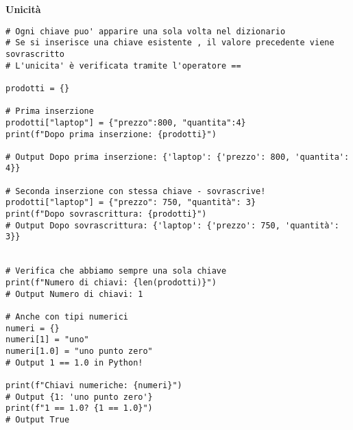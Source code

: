 \vspace{0.5cm}
\textbf{Unicità}
\begin{lstlisting}
# Ogni chiave puo' apparire una sola volta nel dizionario
# Se si inserisce una chiave esistente , il valore precedente viene sovrascritto
# L'unicita' è verificata tramite l'operatore ==

prodotti = {}

# Prima inserzione
prodotti["laptop"] = {"prezzo":800, "quantita":4}
print(f"Dopo prima inserzione: {prodotti}")

# Output Dopo prima inserzione: {'laptop': {'prezzo': 800, 'quantita': 4}}

# Seconda inserzione con stessa chiave - sovrascrive!
prodotti["laptop"] = {"prezzo": 750, "quantità": 3}
print(f"Dopo sovrascrittura: {prodotti}")
# Output Dopo sovrascrittura: {'laptop': {'prezzo': 750, 'quantità': 3}}


# Verifica che abbiamo sempre una sola chiave
print(f"Numero di chiavi: {len(prodotti)}")  
# Output Numero di chiavi: 1

# Anche con tipi numerici
numeri = {}
numeri[1] = "uno"
numeri[1.0] = "uno punto zero"  
# Output 1 == 1.0 in Python!

print(f"Chiavi numeriche: {numeri}")  
# Output {1: 'uno punto zero'}
print(f"1 == 1.0? {1 == 1.0}")  
# Output True
\end{lstlisting}


